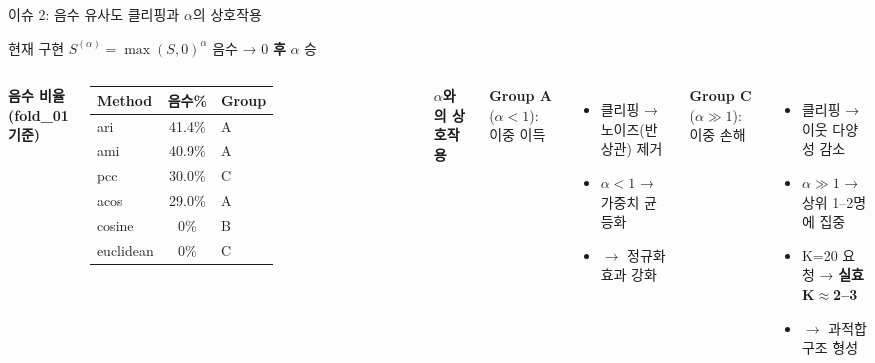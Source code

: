 \documentclass[aspectratio=169,10pt]{beamer}
\begin{document}
\begin{frame}[shrink=5]{이슈 2: 음수 유사도 클리핑과 \(\alpha\)의 상호작용}
	\begin{block}{현재 구현}
		$S^{(\alpha)} = \max(S, 0)^{\alpha}$
		\hfill {\small 음수 → 0 \textbf{후} \(\alpha\) 승}
	\end{block}

	\vspace{0.3em}
	\begin{columns}[T]
			\textbf{음수 비율 (fold\_01 기준)}
			\renewcommand{\arraystretch}{1.15}
			\begin{tabular}{l|c|l}
				\toprule
				Method & 음수\% & Group \\
				\midrule
				ari   & 41.4\% & A \\
				ami   & 40.9\% & A \\
				pcc   & 30.0\% & C \\
				acos  & 29.0\% & A \\
				cosine & 0\%   & B \\
				euclidean & 0\% & C \\
				\bottomrule
			\end{tabular}

			\textbf{\(\alpha\)와의 상호작용}

			{\small\textbf{Group A} (\(\alpha<1\)): 이중 이득}
			\begin{itemize}\small
				\item 클리핑 → 노이즈(반상관) 제거
				\item \(\alpha<1\) → 가중치 균등화
				\item \(\to\) 정규화 효과 강화
			\end{itemize}

			\vspace{0.2em}
			{\small\textbf{Group C} (\(\alpha\gg1\)): 이중 손해}
			\begin{itemize}\small
				\item 클리핑 → 이웃 다양성 감소
				\item \(\alpha\gg1\) → 상위 1--2명에 집중
				\item K=20 요청 → \textbf{실효 K$\approx$2--3}
				\item \(\to\) 과적합 구조 형성
			\end{itemize}
	\end{columns}


\end{frame}
\end{document}
